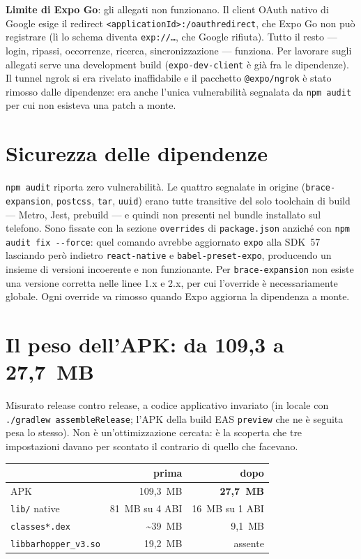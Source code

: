 \documentclass[11pt,a4paper]{report}
\begin{document}
\textbf{Limite di Expo Go}: gli allegati non funzionano. Il client OAuth
nativo di Google esige il redirect \texttt{<applicationId>:/oauthredirect},
che Expo Go non pu\`o registrare (l\`i lo schema diventa \texttt{exp://\dots},
che Google rifiuta). Tutto il resto --- login, ripassi, occorrenze, ricerca,
sincronizzazione --- funziona. Per lavorare sugli allegati serve una
development build (\texttt{expo-dev-client} \`e gi\`a fra le dipendenze).
Il tunnel ngrok si era rivelato inaffidabile e il pacchetto
\texttt{@expo/ngrok} \`e stato rimosso dalle dipendenze: era anche l'unica
vulnerabilit\`a segnalata da \texttt{npm audit} per cui non esisteva una
patch a monte.

\section{Sicurezza delle dipendenze}
\texttt{npm audit} riporta zero vulnerabilit\`a. Le quattro segnalate in
origine (\texttt{brace-expansion}, \texttt{postcss}, \texttt{tar},
\texttt{uuid}) erano tutte transitive del solo toolchain di build — Metro,
Jest, prebuild — e quindi non presenti nel bundle installato sul telefono.
Sono fissate con la sezione \texttt{overrides} di \texttt{package.json}
anzich\'e con \texttt{npm audit fix -{}-force}: quel comando avrebbe
aggiornato \texttt{expo} alla SDK~57 lasciando per\`o indietro
\texttt{react-native} e \texttt{babel-preset-expo}, producendo un insieme di
versioni incoerente e non funzionante. Per \texttt{brace-expansion} non
esiste una versione corretta nelle linee 1.x e 2.x, per cui l'override \`e
necessariamente globale. Ogni override va rimosso quando Expo aggiorna la
dipendenza a monte.

\section{Il peso dell'APK: da 109,3 a 27,7~MB}
\label{sec:peso}

Misurato release contro release, a codice applicativo invariato (in locale con
\texttt{./gradlew assembleRelease}; l'APK della build EAS \texttt{preview} che
ne \`e seguita pesa lo stesso). Non \`e un'ottimizzazione cercata: \`e la
scoperta che tre impostazioni davano per scontato il contrario di quello che
facevano.

\begin{center}
\small
\begin{tabular}{@{}lrr@{}}
\toprule
 & \textbf{prima} & \textbf{dopo} \\
\midrule
APK & 109,3~MB & \textbf{27,7~MB} \\
\texttt{lib/} native & 81~MB su 4 ABI & 16~MB su 1 ABI \\
\texttt{classes*.dex} & \textasciitilde39~MB & 9,1~MB \\
\texttt{libbarhopper\_v3.so} & 19,2~MB & assente \\
\bottomrule
\end{tabular}
\end{center}
\end{document}

